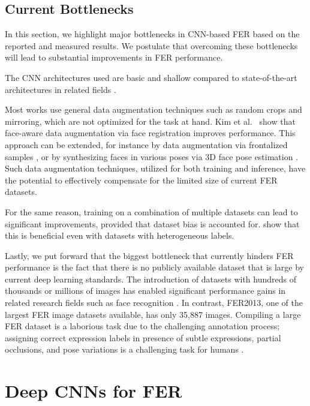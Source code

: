 \documentclass[conference,10pt,a4paper]{IEEEtran}
\begin{document}
\subsection{Current Bottlenecks} \label{sub:current_bottlenecks}

In this section, we highlight major bottlenecks in CNN-based FER based on the reported and measured results. We postulate that overcoming these bottlenecks will lead to substantial improvements in FER performance.

The CNN architectures used are basic and shallow compared to state-of-the-art architectures in related fields \cite{parkhi15,szegedy15,he15}.

Most works use general data augmentation techniques such as random crops and mirroring, which are not optimized for the task at hand. Kim et al.\ \cite{kim16cvpr} show that face-aware data augmentation via face registration improves performance. This approach can be extended, for instance by data augmentation via frontalized samples \cite{hassner15}, or by synthesizing faces in various poses via 3D face pose estimation \cite{taigman14,jeni2015dense}. Such data augmentation techniques, utilized for both training and inference, have the potential to effectively compensate for the limited size of current FER datasets.

For the same reason, training on a combination of multiple datasets can lead to significant improvements, provided that dataset bias is accounted for. \cite{zhang2015} show that this is beneficial even with  datasets with heterogeneous labels.

Lastly, we put forward that the biggest bottleneck that currently hinders FER performance is the fact that there is no publicly available dataset that is large by current deep learning standards. The introduction of datasets with hundreds of thousands or millions of images has enabled significant performance gains in related research fields such as face recognition \cite{taigman14,schroff15,parkhi15}. In contrast, FER2013, one of the largest FER image datasets available, has only 35,887 images. Compiling a large FER dataset is a laborious task due to the challenging annotation process; assigning correct expression labels in presence of subtle expressions, partial occlusions, and pose variations is a challenging task for humans \cite{sariyanidi15}.

\section{Deep CNNs for FER}
\label{sec:Deep CNNs for FER}
\end{document}
